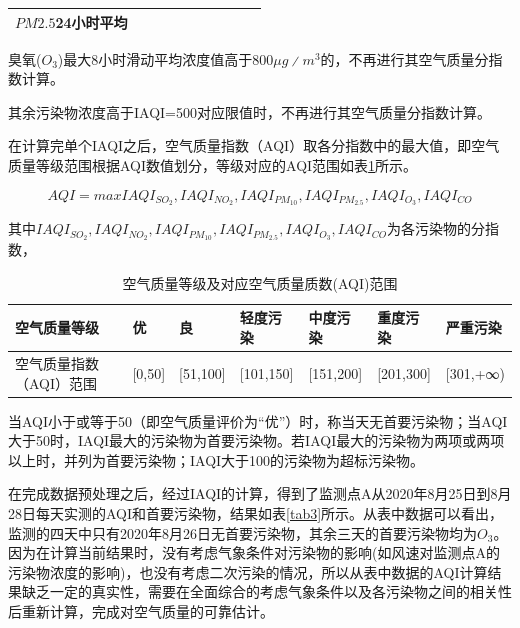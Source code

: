 \documentclass[a4paper,10pt]{my_paper}
\numberwithin{equation}{section}
\begin{document}
\begin{table}[htbp]
\begin{threeparttable}
\begin{tabular}{p{9em}ccccccccc}
      ${PM2.5}$24小时平均 &       &       &       &       &       &       &       &       &  \\
      \bottomrule
      \end{tabular}%
      \begin{tablenotes}%
      \item[1]\scriptsize{ 臭氧(${O_3}$)最大8小时滑动平均浓度值高于800${\mu g∕m^3}$的，不再进行其空气质量分指数计算。} 
      \item[2]\scriptsize{ 其余污染物浓度高于IAQI=500对应限值时，不再进行其空气质量分指数计算。} 
      \end{tablenotes}
    \end{threeparttable}
  \end{table}%
  
在计算完单个IAQI之后，空气质量指数（AQI）取各分指数中的最大值，即空气质量等级范围根据AQI数值划分，等级对应的AQI范围如表\ref{tab2}所示。

\begin{equation}
  AQI = max{IAQI_{SO_2},IAQI_{NO_2},IAQI_{PM_10},IAQI_{PM_2.5},IAQI_{O_3},IAQI_{CO}}
\end{equation}

其中${IAQI_{SO_2},IAQI_{NO_2},IAQI_{PM_10},IAQI_{PM_2.5},IAQI_{O_3},IAQI_{CO}}$为各污染物的分指数，

\begin{table}[htbp]
    \centering
    \caption{空气质量等级及对应空气质量质数(AQI)范围}\label{tab2}%
      \begin{tabular}{p{11em}p{4.055em}p{4.055em}p{4.055em}p{4.055em}p{4.055em}p{4.055em}}
      \toprule
      空气质量等级 & 优     & 良     & 轻度污染  & 中度污染  & 重度污染  & 严重污染 \\
      \midrule
      空气质量指数（AQI）范围 & [0,50] & [51,100] & [101,150] & [151,200] & [201,300] & [301,+∞) \\
      \bottomrule
      \end{tabular}%
  \end{table}%

当AQI小于或等于50（即空气质量评价为“优”）时，称当天无首要污染物；当AQI大于50时，IAQI最大的污染物为首要污染物。若IAQI最大的污染物为两项或两项以上时，并列为首要污染物；IAQI大于100的污染物为超标污染物。

在完成数据预处理之后，经过IAQI的计算，得到了监测点A从2020年8月25日到8月28日每天实测的AQI和首要污染物，结果如表\ref{tab3}所示。从表中数据可以看出，监测的四天中只有2020年8月26日无首要污染物，其余三天的首要污染物均为${O_3}$。因为在计算当前结果时，没有考虑气象条件对污染物的影响(如风速对监测点A的污染物浓度的影响)，也没有考虑二次污染的情况，所以从表中数据的AQI计算结果缺乏一定的真实性，需要在全面综合的考虑气象条件以及各污染物之间的相关性后重新计算，完成对空气质量的可靠估计。
\end{document}
